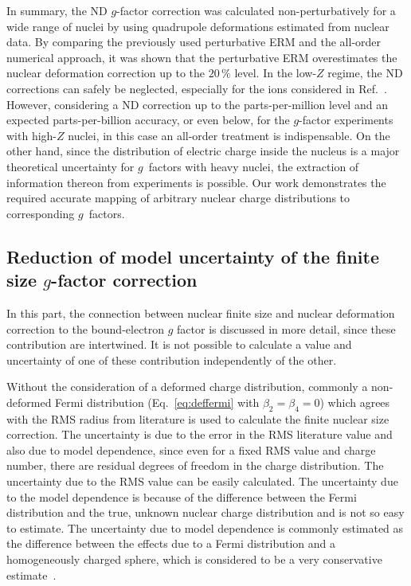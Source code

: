 In summary, the ND $g$-factor correction was calculated non-perturbatively for a wide range of nuclei by using quadrupole deformations estimated from nuclear data.
By comparing the previously used perturbative ERM and the all-order numerical approach, it was shown that the perturbative ERM overestimates the nuclear deformation correction up to the $20\,\%$ level.
In the low-$Z$ regime, the ND corrections can safely be neglected, especially for the ions considered in Ref.~\cite{Sturm2014}. However, considering a ND correction up to the parts-per-million level and an expected parts-per-billion accuracy, or even below, for the $g$-factor experiments with high-$Z$ nuclei, in this case an all-order treatment is indispensable. 
On the other hand, since the distribution of electric charge inside the nucleus is a major theoretical uncertainty for $g$~factors with heavy nuclei, the extraction of information thereon from experiments is possible. Our work demonstrates the required accurate mapping of arbitrary nuclear charge distributions to corresponding $g$~factors.\\[0.6cm]

\subsection{Reduction of model uncertainty of the finite size $g$-factor correction}
In this part, the connection between nuclear finite size and nuclear deformation correction to the bound-electron $g$ factor is discussed in more detail, since these contribution are intertwined. It is not possible to calculate a value and uncertainty of one of these contribution independently of the other.

Without the consideration of a deformed charge distribution, commonly a non-deformed Fermi distribution (Eq.~\eqref{eq:deffermi} with ${\beta_2}{=}{\beta_4}{=}0$) which agrees with the RMS radius from literature is used to calculate the finite nuclear size correction. 
The uncertainty is due to the error in the RMS literature value and also due to model dependence, since even for a fixed RMS value and charge number, there are residual degrees of freedom in the charge distribution. The uncertainty due to the RMS value can be easily calculated. The uncertainty due to the model dependence is because of the difference between the Fermi distribution and the true, unknown nuclear charge distribution and is not so easy to estimate. The uncertainty due to model dependence is commonly estimated as the difference between the effects due to a Fermi distribution and a homogeneously charged sphere, which is considered to be a very conservative estimate~\cite{Shabaev2006}.

